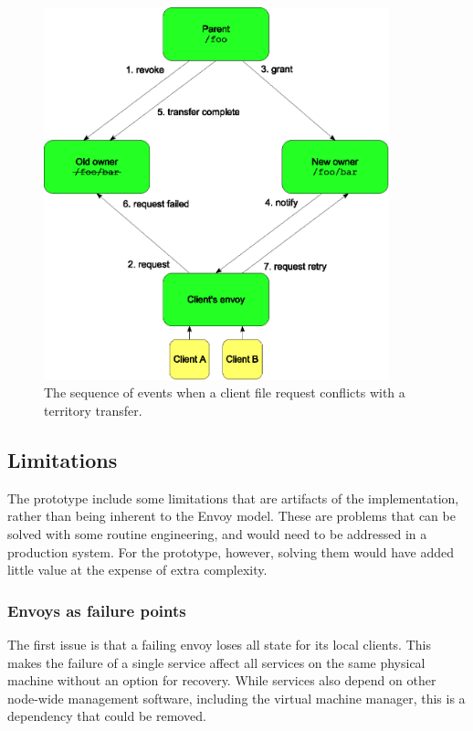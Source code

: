 \begin{figure}[tp]
\centering
\includegraphics[width=100mm]{figures/migrate-sync}
\caption[Sequence of events in a territory migration]{The sequence of events when a client file request conflicts with a territory transfer.}
\label{fig:migrate-sync}
\end{figure}

\subsection{Limitations}

The prototype include some limitations that are artifacts of the implementation, rather than being inherent to the Envoy model. These are problems that can be solved with some routine engineering, and would need to be addressed in a production system. For the prototype, however, solving them would have added little value at the expense of extra complexity.

\subsubsection{Envoys as failure points}

The first issue is that a failing envoy loses all state for its local clients. This makes the failure of a single service affect all services on the same physical machine without an option for recovery. While services also depend on other node-wide management software, including the virtual machine manager, this is a dependency that could be removed.

